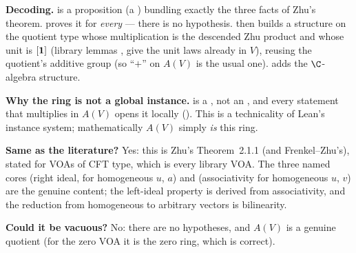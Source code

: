 \begin{dictionary}
\textbf{Decoding.}  is a proposition (a ) bundling exactly the
three facts of Zhu's theorem.  proves it for \emph{every}  --- there is no
hypothesis.  then builds a  structure on the quotient type  whose
multiplication is the descended Zhu product and whose unit is $[\mathbf{1}]$ (library lemmas
,  give the unit laws already in $V$), reusing the quotient's
additive group (so ``$+$'' on $A(V)$ is the usual one).  adds the $\C$-algebra structure.

\textbf{Why the ring is not a global instance.}  is a , not an , and
every statement that multiplies in $A(V)$ opens it locally (). This is a technicality
of Lean's instance system; mathematically $A(V)$ simply \emph{is} this ring.

\textbf{Same as the literature?} Yes: this is Zhu's Theorem~2.1.1 (and Frenkel--Zhu's), stated for VOAs of CFT
type, which is every library VOA. The three named cores  (right ideal, for
homogeneous $u$, $a$) and  (associativity for homogeneous $u$, $v$) are the genuine
content; the left-ideal property is derived from associativity, and the reduction from homogeneous to arbitrary
vectors is bilinearity.

\textbf{Could it be vacuous?} No: there are no hypotheses, and $A(V)$ is a genuine quotient (for the zero
VOA it is the zero ring, which is correct).
\end{dictionary}


